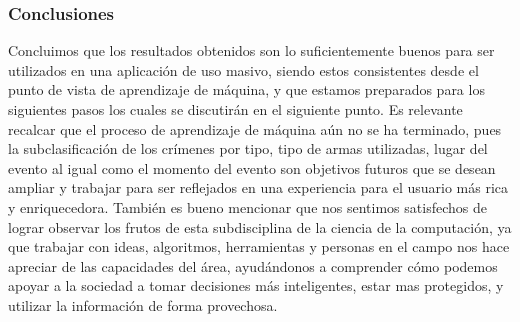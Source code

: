 \documentclass{beamer}
\newcommand\Fontvi{\fontsize{10}{7.2}\selectfont}
\begin{document}
\begin{frame}
\frametitle{Conclusiones}
\Fontvi
Concluimos que los resultados obtenidos son lo suficientemente buenos para ser utilizados en una aplicaci\'{o}n de uso masivo, siendo estos consistentes desde el punto de vista de aprendizaje de m\'{a}quina, y que estamos preparados para los siguientes pasos los cuales se discutir\'{a}n en el siguiente punto.
Es relevante recalcar que el proceso de aprendizaje de m\'{a}quina aún no se ha terminado, pues la subclasificaci\'{o}n de los cr\'{i}menes por tipo, tipo de armas utilizadas, lugar del evento al igual como el momento del evento son objetivos futuros que se desean ampliar y trabajar para ser reflejados en una experiencia para el usuario m\'{a}s rica y enriquecedora. 
Tambi\'{e}n es bueno mencionar que nos sentimos satisfechos de lograr observar los frutos de esta subdisciplina de la ciencia de la computaci\'{o}n, ya que trabajar con ideas, algoritmos, herramientas y personas en el campo nos hace apreciar de las capacidades del \'{a}rea, ayud\'{a}ndonos a comprender c\'{o}mo podemos apoyar a la sociedad a tomar decisiones m\'{a}s inteligentes, estar mas protegidos, y utilizar la informaci\'{o}n de forma provechosa. 
\end{frame}
\end{document}

